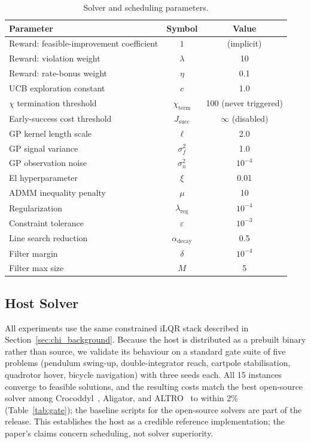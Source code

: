 \documentclass[lettersize,journal]{IEEEtran}
\begin{document}
\begin{table}[t]
\caption{Solver and scheduling parameters.}
\label{tab:solver_params}
\centering
\footnotesize
\setlength{\tabcolsep}{3pt}
\begin{tabular}{lcc}
\toprule
\textbf{Parameter} & \textbf{Symbol} & \textbf{Value} \\
\midrule
Reward: feasible-improvement coefficient & $1$ & (implicit) \\
Reward: violation weight & $\lambda$ & 10 \\
Reward: rate-bonus weight & $\eta$ & 0.1 \\
UCB exploration constant & $c$ & 1.0 \\
$\chi$ termination threshold & $\chi_{\mathrm{term}}$ & 100 (never triggered) \\
Early-success cost threshold & $J_{\mathrm{succ}}$ & $\infty$ (disabled) \\
GP kernel length scale & $\ell$ & 2.0 \\
GP signal variance & $\sigma_f^2$ & 1.0 \\
GP observation noise & $\sigma_n^2$ & $10^{-4}$ \\
El hyperparameter & $\xi$ & 0.01 \\
\midrule
ADMM inequality penalty & $\mu$ & 10 \\
Regularization & $\lambda_{\mathrm{reg}}$ & $10^{-4}$ \\
Constraint tolerance & $\varepsilon$ & $10^{-3}$ \\
Line search reduction & $\alpha_{\mathrm{decay}}$ & 0.5 \\
Filter margin & $\delta$ & $10^{-4}$ \\
Filter max size & $M$ & 5 \\
\bottomrule
\end{tabular}
\end{table}

\subsection{Host Solver}
\label{sec:host_note}

All experiments use the same constrained iLQR stack described in
Section~\ref{sec:chi_background}.  Because the host is distributed as a
prebuilt binary rather than source, we validate its behaviour on a
standard gate suite of five problems (pendulum swing-up, double-integrator
reach, cartpole stabilisation, quadrotor hover, bicycle navigation) with
three seeds each.  All 15 instances converge to feasible solutions, and
the resulting costs match the best open-source solver among
Crocoddyl~\cite{mastalli2020}, Aligator, and ALTRO~\cite{howell2019} to
within 2\% (Table~\ref{tab:gate}); the baseline scripts for the
open-source solvers are part of the release.  This establishes the host as
a credible reference implementation; the paper's claims concern
scheduling, not solver superiority.
\end{document}
